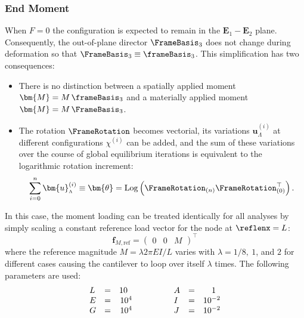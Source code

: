 \subsubsection{End Moment }\label{sec:frame-1001}
%
%
When \(F = 0\) the configuration is expected
to remain in the \(\mathbf{E}_1 - \mathbf{E}_2\) plane.
Consequently, the out-of-plane director
\(\FrameBasis_3\) does not change during deformation so that \(\FrameBasis_3 \equiv \frameBasis_3\).
This simplification has two consequences:
\begin{itemize}
  \item There is no distinction between a spatially applied moment \(\bm{M} = M \, \frameBasis_3\)
    and a materially applied moment \(\bm{M} = M \, \FrameBasis_3\).
  \item The rotation \(\FrameRotation\) becomes
    vectorial, its variations \(\bm{u}_{\scriptscriptstyle{\Lambda}}^{(i)}\) at different configurations \(\chi^{(i)}\) can be added, and the sum of these variations over the course of global equilibrium iterations is equivalent
    to the logarithmic rotation increment:
    \[
      \sum_{i=0}^n \bm{u}_{\scriptscriptstyle{\Lambda}}^{(i)} \equiv \bm{\theta} 
     = \operatorname{Log} \left(\FrameRotation_{(n)}\FrameRotation_{(0)}^{\top}\right).
    \]
\end{itemize}
%
In this case, the moment loading can be treated identically for all analyses by simply scaling a constant reference load vector for the node at \(\reflenx=L\):
%
\begin{equation}
  \mathbf{f}_{M,\text{ref}} = \begin{pmatrix}
     0 & 0 & M
  \end{pmatrix}^{\top}
  \label{eq:fref}
\end{equation}
%
where the reference magnitude \(M = \lambda 2 \pi EI/L \) varies with $\lambda=1/8, \ 1$, and $2$ for different cases causing the cantilever to loop over itself \(\lambda\) times. 
The following parameters are used:
\[
\begin{array}{lcr}
    L  &=&    10\hphantom{..}    \\ %
    E  &=&    10^4  \\ %
    G  &=&    10^4  \\ %
\end{array}
\qquad\qquad
\begin{array}{lcr}
    A  &=& 1\hphantom{..} \\
    I  &=& 10^{-2} \\
    J  &=& 10^{-2} \\
\end{array}
\]
